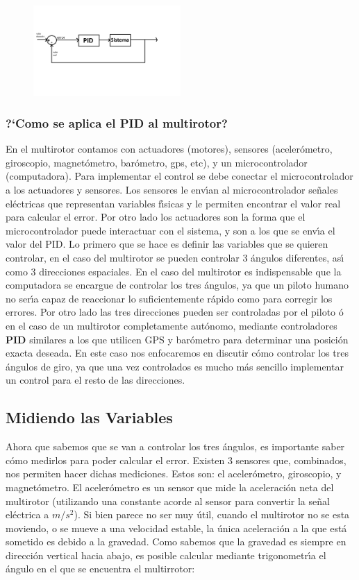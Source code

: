 \documentclass[journal]{IEEEtran}
\begin{document}
\begin{figure}[h]
\includegraphics[width=0.5\textwidth]
{PID_explicacion}
\end{figure}

\subsubsection{{?`}Como se aplica el \textbf{PID} al multirotor?}
En el multirotor contamos con actuadores (motores), sensores (aceler\'ometro, giroscopio, magnet\'ometro, bar\'ometro, gps, etc), y un microcontrolador (computadora). Para implementar el control se debe conectar el microcontrolador a los actuadores y sensores. Los sensores le env{\'\i}an al microcontrolador se\~nales el\'ectricas que representan variables f{\'\i}sicas y le permiten encontrar el valor real para calcular el error. Por otro lado los actuadores son la forma que el microcontrolador puede interactuar con el sistema, y son a los que se env{\'\i}a el valor del PID.  
Lo primero que se hace es definir las variables que se quieren controlar, en el caso del multirotor se pueden controlar 3 \'angulos diferentes, as{\'\i} como 3 direcciones espaciales.
En el caso del multirotor es indispensable que la computadora se encargue de controlar los tres \'angulos, ya que un piloto humano no ser{\'\i}a capaz de reaccionar lo suficientemente r\'apido como para corregir los errores. Por otro lado las tres direcciones pueden ser controladas por el piloto \'o en el caso de un multirotor completamente aut\'onomo, mediante controladores \textbf{PID} similares a los que utilicen GPS y bar\'ometro para determinar una posici\'on exacta deseada.
En este caso nos enfocaremos en discutir c\'omo controlar los tres \'angulos de giro, ya que una vez controlados es mucho m\'as sencillo implementar un control para el resto de las direcciones.

\subsection{Midiendo las Variables}
Ahora que sabemos que se van a controlar los tres \'angulos, es importante saber c\'omo medirlos para poder calcular el error. Existen 3 sensores que, combinados, nos permiten hacer dichas mediciones. Estos son: el aceler\'ometro, giroscopio, y magnet\'ometro.
El aceler\'ometro es un sensor que mide la aceleraci\'on neta del multirotor (utilizando una constante acorde al sensor para convertir la se\~nal el\'ectrica a $m/s^{2}$). Si bien parece no ser muy \'util, cuando el multirotor no se esta moviendo, o se mueve a una velocidad estable, la \'unica aceleraci\'on a la que est\'a sometido es debido a la gravedad. Como sabemos que la gravedad es siempre en direcci\'on vertical hacia abajo, es posible calcular mediante trigonometr{\'\i}a el \'angulo en el que se encuentra el multirrotor:
\end{document}
